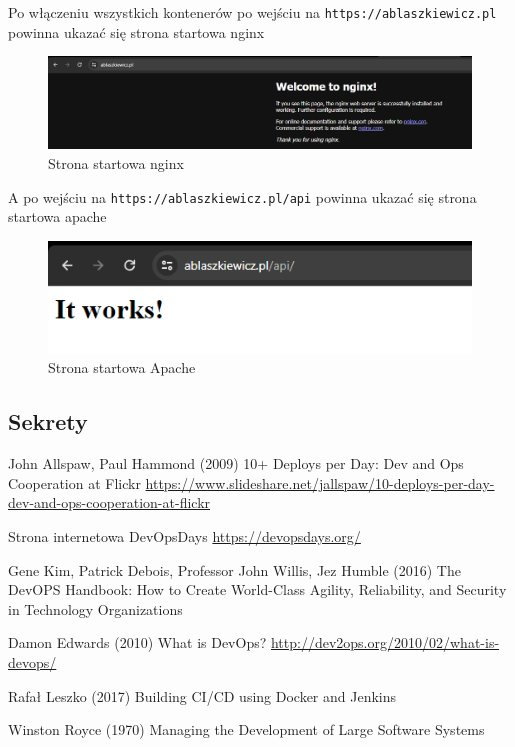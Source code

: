 \documentclass{article}
\begin{document}
Po włączeniu wszystkich kontenerów po wejściu na \lstinline|https://ablaszkiewicz.pl| powinna ukazać się strona startowa nginx

\begin{figure}[H]
    \centering
    \includegraphics[width=1\linewidth]{reverseProxyNginx.png}
    \caption{Strona startowa nginx}
    \label{fig:enter-label}
\end{figure}

A po wejściu na \lstinline|https://ablaszkiewicz.pl/api| powinna ukazać się strona startowa apache

\begin{figure}[H]
    \centering
    \includegraphics[width=1\linewidth]{reverseProxyApache.png}
    \caption{Strona startowa Apache}
    \label{fig:enter-label}
\end{figure}

\subsection{Sekrety}

\begin{thebibliography}{9}

John Allspaw, Paul Hammond (2009) 10+ Deploys per Day: Dev and Ops Cooperation at Flickr \url{https://www.slideshare.net/jallspaw/10-deploys-per-day-dev-and-ops-cooperation-at-flickr}

Strona internetowa DevOpsDays \url{https://devopsdays.org/}

Gene Kim, Patrick Debois, Professor John Willis, Jez Humble (2016) The DevOPS Handbook: How to Create World-Class Agility, Reliability, and Security in Technology Organizations

Damon Edwards (2010) What is DevOps? \url{http://dev2ops.org/2010/02/what-is-devops/}

Rafał Leszko (2017) Building CI/CD using Docker and Jenkins

Winston Royce (1970) Managing the Development of Large Software Systems

\end{thebibliography}
\end{document}
